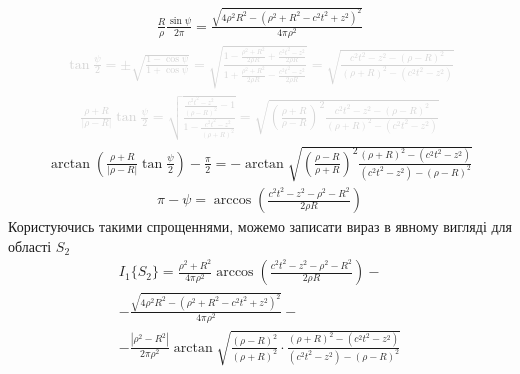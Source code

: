 %
\begin{equation*} \begin{aligned}
\frac{R}{\rho} \frac{\sin \psi}{2 \pi} = 
\frac{\sqrt{4 \rho^2 R^2 - (\rho^2 + R^2 - c^2t^2 + z^2)^2}}{4 \pi \rho^2}
\end{aligned} \end{equation*}
%
\textcolor{lightgray}{ \begin{equation*} \begin{aligned}
\tan \frac{\psi}{2} = \pm \sqrt{ \frac{1 - \cos \psi}{1 + \cos \psi} } = 
\sqrt{ \frac{1- \frac{\rho^2 + R^2}{2 \rho R} + \frac{c^2 t^2 - z^2}{2 \rho R}}
{1 + \frac{\rho^2 + R^2}{2 \rho R} - \frac{c^2 t^2 - z^2}{2 \rho R}} } =
\sqrt{ \frac{c^2t^2 - z^2 - \left( \rho - R \right)^2}
{\left( \rho + R \right)^2 - \left( c^2t^2 - z^2 \right)} }
\end{aligned} \end{equation*} }
%
\textcolor{lightgray}{ \begin{equation*} \begin{aligned}
\frac{\rho + R}{ |\rho - R| } \tan \frac{\psi}{2} = 
\sqrt{ \frac{ \frac{c^2t^2 - z^2}{\left( \rho - R \right)^2} - 1}
{ 1 - \frac{c^2t^2 - z^2}{\left( \rho + R \right)^2} } } = 
\sqrt{ \left( \frac{\rho + R}{\rho - R} \right)^2
\frac{c^2t^2 - z^2 - \left( \rho - R \right)^2}
{\left( \rho + R \right)^2 - \left( c^2t^2 - z^2 \right)} }
\end{aligned} \end{equation*} }
%
\begin{equation*} \begin{aligned}
\arctan \left( \frac{\rho + R}{ |\rho - R| } \tan \frac{\psi}{2} \right) - 
\frac{\pi}{2} = - \arctan \sqrt{ \left( \frac{\rho - R}{\rho + R} \right)^2
\frac{\left( \rho + R \right)^2 - \left( c^2t^2 - z^2 \right)} 
{\left( c^2t^2 - z^2 \right) - \left( \rho - R \right)^2} }
\end{aligned} \end{equation*}
%
\begin{equation*} \begin{aligned}
\pi - \psi = \arccos \left( \frac{c^2 t^2 - z^2 - \rho^2 - R^2}{2 \rho R} \right)
\end{aligned} \end{equation*}
%
Користуючись такими спрощеннями, можемо записати вираз в явному вигляді для 
області $ S_2 $
%
\begin{equation*} \begin{aligned}
I_1 \{ S_2 \} = \frac{\rho^2 + R^2}{4 \pi \rho^2} \arccos 
\left( \frac{c^2 t^2 - z^2 - \rho^2 - R^2}{2 \rho R} \right) - \\
- \frac{\sqrt{4 \rho^2 R^2 - (\rho^2 + R^2 - c^2t^2 + z^2)^2}}{4 \pi \rho^2} - \\
- \frac{ |\rho^2 - R^2| }{2 \pi \rho^2} 
\arctan \sqrt{ \frac{(\rho - R)^2}{(\rho + R)^2} \cdot
\frac{\left( \rho + R \right)^2 - \left( c^2t^2 - z^2 \right)} 
{\left( c^2t^2 - z^2 \right) - \left( \rho - R \right)^2} }
\end{aligned} \end{equation*}

